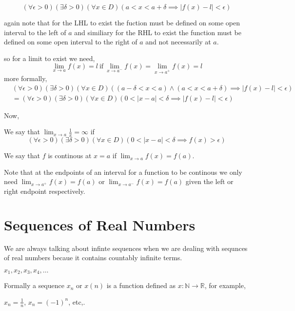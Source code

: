 \documentclass[12pt,a4paper]{article}
\begin{document}
\[(\forall \epsilon > 0)(\exists \delta > 0)(\forall x \in D)( a < x < a + \delta \implies |f(x) - l| < \epsilon )\] 

again note that for the LHL to exist the fuction must be defined on some open interval to the left of \(a\) and similiary for the RHL to exist the function must be defined on some open interval to the right of \(a\) and not necessarily at \(a\).   

so for a limit to exist we need, 
\[ \lim_{x \to a} f(x) = l \ \text{if} \ \lim_{x \to a^{-}} f(x) = \lim_{x \to a^+} f(x) = l \]
more formally,
\begin{align*}
    &(\forall \epsilon > 0)(\exists \delta > 0)(\forall x \in D)(( a - \delta < x < a) \wedge 
    ( a < x < a +\delta) \implies |f(x) - l| < \epsilon ) \\
    &= (\forall \epsilon > 0)(\exists \delta > 0)(\forall x \in D)(0 < |x-a| < \delta 
    \implies |f(x) - l| < \epsilon)
\end{align*}

Now,

We say that \( \lim_{x \to a} \frac{1}{x} = \infty \) if 
\begin{equation*}
    (\forall \epsilon > 0)(\exists \delta > 0)(\forall x \in D)(0 < |x-a| < \delta \implies f(x) > \epsilon)
\end{equation*}      

We say that \(f\) is continous at \( x =a\) if \( \lim_{x \to a}f(x) = f(a)\).    

Note that at the endpoints of an interval for a function to be continous we only need \( \lim_{x \to a^+}f(x) = f(a)\) or \( \lim_{x \to a^{-}}f(x) = f(a)\) given the left or right endpoint respectively.

\section{Sequences of Real Numbers} 
We are always talking about infinte sequences when we are dealing with sequnces of real numbers becaue it contains countably infinite terms.

\(x_{1},x_{2},x_{3},x_{4},\ldots \)

Formally a sequence \(x_{n} \) or \(x(n)\) is a function defined as \( x:\mathbb{N}\to\mathbb{R}\), for example,

\(x_{n}=\frac{1}{n}\), \(x_{n} = (-1)^n\), etc,. 
\end{document}
